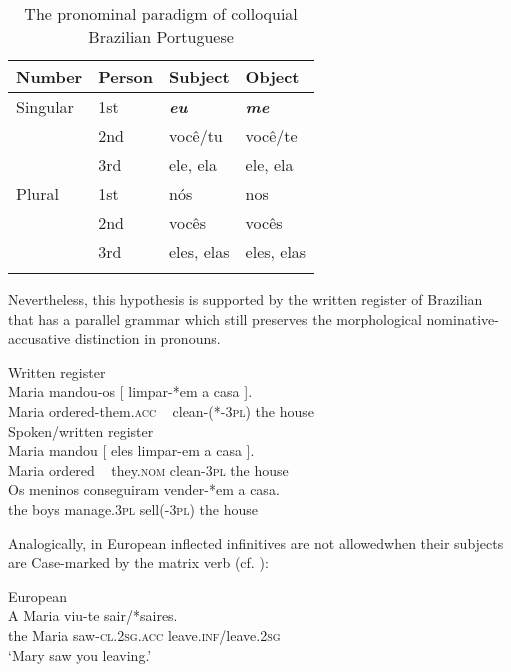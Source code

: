 \documentclass[output=paper]{langsci/langscibook}
\begin{document}
\begin{table}
\caption{\label{tab:moreno:1}The pronominal paradigm of colloquial Brazilian Portuguese}
\begin{tabular}{llll}
\lsptoprule
{Number}   & Person & Subject & Object\\\midrule
{Singular} & 1st & \textbf{\textit{eu}} & \textbf{\textit{me}}\\
           & 2nd & você/tu & você/te\\
           & 3rd & ele, ela & ele, ela\\\midrule
{Plural}   & 1st & nós & nos\\
           & 2nd & vocês & vocês\\
           & 3rd & eles, elas & eles, elas\\
\lspbottomrule
\end{tabular}
\end{table}

Nevertheless, this hypothesis is supported by the written register of Brazilian  that has a parallel grammar which still preserves the morphological nominative-accusative distinction in pronouns.

\ea%
    \label{ex:moreno:24}
    \ea  Written register\\
    \gll Maria mandou-os     [  limpar-*em    a    casa ].   \\
         Maria ordered-them.\textsc{acc}   ~    clean-(*-\textsc{3pl}) the house\\
    \ex  Spoken/written register\\
    \gll Maria mandou [ eles   limpar-em a    casa ].   \\
         Maria ordered  ~  they.\textsc{nom} clean-\textsc{3pl}  the house \\
    \ex  
    \gll Os meninos conseguiram  vender-*em  a    casa. \\
         the boys      manage.\textsc{3pl}    sell(-\textsc{3pl})     the house \\
\z
\z

Analogically, in European  inflected infinitives are not allowed\linebreak when their subjects are Case-marked by the matrix verb (cf. \citealt{Hornstein2008}):

\ea%
         European \label{ex:moreno:25}\\
    \gll A   Maria viu-te           sair/*saires.\\
         the Maria saw-\textsc{cl.2sg.acc} leave.\textsc{inf}/leave.\textsc{2sg}\\
    \glt ‘Mary saw you leaving.’
\z
\end{document}

